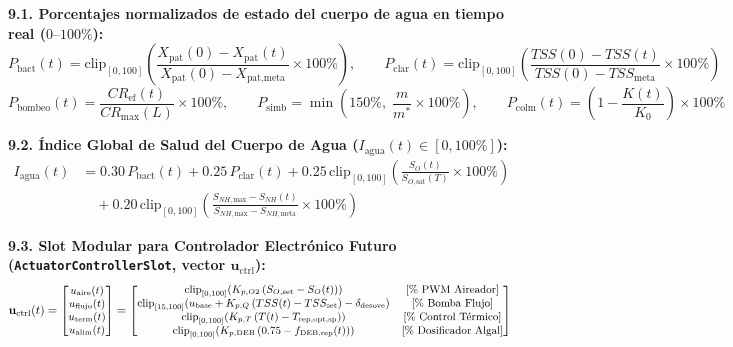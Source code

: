 \documentclass[11pt,letterpaper]{article}
\begin{document}
\begin{formulabox}
\textbf{9.1. Porcentajes normalizados de estado del cuerpo de agua en tiempo real ($0\text{--}100\%$):}
\begin{equation}
P_{\text{bact}}(t) = \text{clip}_{[0,100]}\!\left(\frac{X_{\text{pat}}(0) - X_{\text{pat}}(t)}{X_{\text{pat}}(0) - X_{\text{pat,meta}}}\times 100\%\right), \qquad P_{\text{clar}}(t) = \text{clip}_{[0,100]}\!\left(\frac{TSS(0) - TSS(t)}{TSS(0) - TSS_{\text{meta}}}\times 100\%\right)
\label{eq:pbact_clar}
\end{equation}
\begin{equation}
P_{\text{bombeo}}(t) = \frac{CR_{\text{ef}}(t)}{CR_{\max}(L)}\times 100\%, \qquad P_{\text{simb}} = \min\!\left(150\%,\; \frac{m}{m^*}\times 100\%\right), \qquad P_{\text{colm}}(t) = \left(1 - \frac{K(t)}{K_0}\right)\times 100\%
\label{eq:pbombeo_simb}
\end{equation}

\textbf{9.2. Índice Global de Salud del Cuerpo de Agua ($I_{\text{agua}}(t) \in [0, 100\%]$):}
\begin{equation}
\begin{aligned}
I_{\text{agua}}(t) &= 0.30\,P_{\text{bact}}(t) + 0.25\,P_{\text{clar}}(t) + 0.25\,\text{clip}_{[0,100]}\!\left(\frac{S_O(t)}{S_{O,\text{sat}}(T)}\times 100\%\right) \\
&\quad + 0.20\,\text{clip}_{[0,100]}\!\left(\frac{S_{NH,\text{max}} - S_{NH}(t)}{S_{NH,\text{max}} - S_{NH,\text{meta}}}\times 100\%\right)
\end{aligned}
\label{eq:iagua}
\end{equation}

\textbf{9.3. Slot Modular para Controlador Electrónico Futuro (\texttt{ActuatorControllerSlot}, vector $\mathbf{u}_{\text{ctrl}}$):}
\begin{equation}
{\small
\mathbf{u}_{\text{ctrl}}(t) = \begin{bmatrix} u_{\text{aire}}(t) \\ u_{\text{flujo}}(t) \\ u_{\text{term}}(t) \\ u_{\text{alim}}(t) \end{bmatrix} = \begin{bmatrix} \text{clip}_{[0,100]}\!\left(K_{p,O2}\,(S_{O,\text{set}} - S_O(t))\right) & \text{[\% PWM Aireador]} \\ \text{clip}_{[15,100]}\!\left(u_{\text{base}} + K_{p,Q}\,(TSS(t) - TSS_{\text{set}}) - \delta_{\text{desove}}\right) & \text{[\% Bomba Flujo]} \\ \text{clip}_{[0,100]}\!\left(K_{p,T}\,(T(t) - T_{\text{rep,opt,sp}})\right) & \text{[\% Control Térmico]} \\ \text{clip}_{[0,100]}\!\left(K_{p,\text{DEB}}\,(0.75 - f_{\text{DEB,rep}}(t))\right) & \text{[\% Dosificador Algal]} \end{bmatrix}
}
\label{eq:uctrl}
\end{equation}
\end{formulabox}
\end{document}
